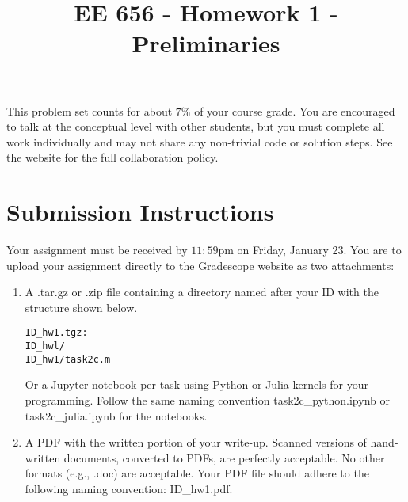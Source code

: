 \documentclass{article}
\title{EE 656 - Homework 1 - Preliminaries }
\author{}
\theoremstyle{definition}
\begin{document}
\maketitle


This problem set counts for about $7 \%$ of your course grade. You are encouraged to talk at the conceptual level with other students, but you must complete all work individually and may not share any non-trivial code or solution steps. See the website for the full collaboration policy.

\section*{Submission Instructions}
Your assignment must be received by $11: 59 \mathrm{pm}$ on Friday, January 23. You are to upload your assignment directly to the Gradescope website as two attachments:


\begin{enumerate}
  \item A .tar.gz or .zip file containing a directory named after your ID with the structure shown below.


\begin{verbatim}
ID_hw1.tgz:
ID_hwl/
ID_hw1/task2c.m
\end{verbatim}

Or a Jupyter notebook per task using Python or Julia kernels for your programming. Follow the same naming convention task2c\_python.ipynb or task2c\_julia.ipynb for the notebooks.

\item A PDF with the written portion of your write-up. Scanned versions of hand-written documents, converted to PDFs, are perfectly acceptable. No other formats (e.g., .doc) are acceptable. Your PDF file should adhere to the following naming convention: ID\_hw1.pdf.

\end{enumerate}
\end{document}
